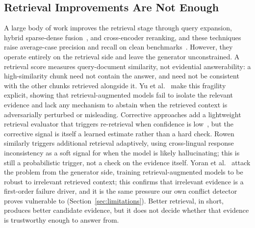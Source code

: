 \documentclass[conference]{IEEEtran}
\begin{document}
\subsection{Retrieval Improvements Are Not Enough}
A large body of work improves the retrieval stage through query expansion,
hybrid sparse-dense fusion~\cite{mala2025hybrid}, and cross-encoder
reranking, and these techniques raise average-case precision and recall on
clean benchmarks~\cite{yu2024evaluation}. However, they operate entirely on
the retrieval side and leave the generator unconstrained. A retrieval score
measures query-document similarity, not evidential answerability: a
high-similarity chunk need not contain the answer, and need not be
consistent with the other chunks retrieved alongside it. Yu et
al.~\cite{yu2023reeval} make this fragility explicit, showing that
retrieval-augmented models fail to isolate the relevant evidence and lack
any mechanism to abstain when the retrieved context is adversarially
perturbed or misleading. Corrective approaches add a lightweight retrieval
evaluator that triggers re-retrieval when confidence is
low~\cite{yan2024crag}, but the corrective signal is itself a learned
estimate rather than a hard check. Rowen~\cite{ding2025rowen} similarly
triggers additional retrieval adaptively, using cross-lingual response
inconsistency as a soft signal for when the model is likely hallucinating;
this is still a probabilistic trigger, not a check on the evidence itself.
Yoran et al.~\cite{yoran2024making} attack
the problem from the generator side, training retrieval-augmented models to be
robust to irrelevant retrieved context; this confirms that irrelevant evidence
is a first-order failure driver, and it is the same pressure our own conflict
detector proves vulnerable to (Section~\ref{sec:limitations}). Better
retrieval, in short, produces better candidate evidence, but it does not
decide whether that evidence is trustworthy enough to answer from.
\end{document}
